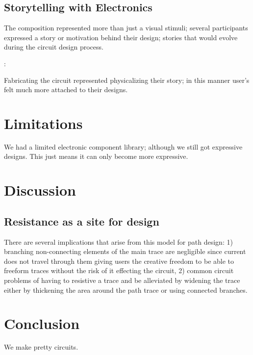 \documentclass{sigchi}
\begin{document}
\subsection{Storytelling with Electronics}
  The composition represented more than just a visual stimuli; several participants expressed a story or motivation behind their design; stories that would evolve during the circuit design process.
  \begin{myquote}
   \vspace{-2pt}
    :
    \vspace{-2pt}
  \end{myquote}
  Fabricating the circuit represented physicalizing their story; in this manner user's felt much more attached to their designs.

\section{Limitations}
  We had a limited electronic component library; although we still got expressive designs. This just means it can only become more expressive.


\section {Discussion}

  \subsection{Resistance as a site for design}
    There are several implications that arise from this model for path design: 1) branching non-connecting elements of the main trace are negligible since current does not travel through them giving users the creative freedom to be able to freeform traces without the risk of it effecting the circuit, 2) common circuit problems of having to resistive a trace and be alleviated by widening the trace either by thickening the area around the path trace or using connected branches.
\section {Conclusion}
We make pretty circuits.


\balance



\end{document}
